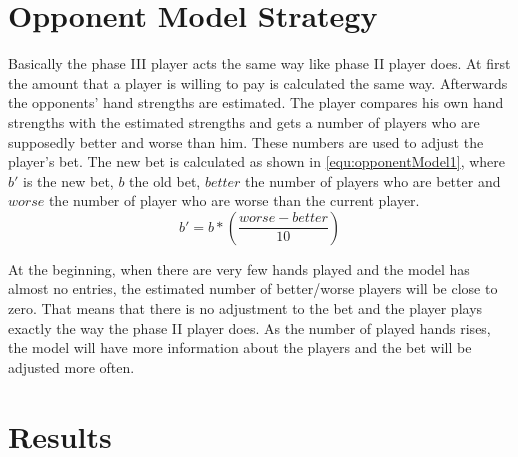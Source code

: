 \section{Opponent Model Strategy}
Basically the phase III player acts the same way like phase II player does. At first the amount that a player is willing to pay is calculated the same way. Afterwards the opponents' hand strengths are estimated. The player compares his own hand strengths with the estimated strengths and gets a number of players who are supposedly better and worse than him. These numbers are used to adjust the player's bet. The new bet is calculated as shown in \ref{equ:opponentModel1}, where $b'$ is the new bet, $b$ the old bet, $better$ the number of players who are better and $worse$ the number of player who are worse than the current player.
\begin{equation}
	\label{equ:opponentModel1}
	b' = b * (\frac{worse - better}{10})
\end{equation}

At the beginning, when there are very few hands played and the model has almost no entries, the estimated number of better/worse players will be close to zero. That means that there is no adjustment to the bet and the player plays exactly the way the phase II player does. As the number of played hands rises, the model will have more information about the players and the bet will be adjusted more often.

\section{Results}

